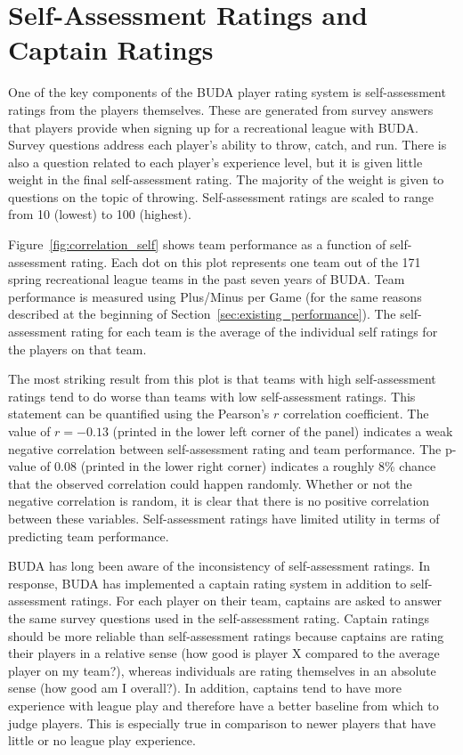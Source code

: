 \section{Self-Assessment Ratings and Captain Ratings}\label{sec:self_rating}

One of the key components of the BUDA player rating system is self-assessment ratings from the players themselves.  These are generated from survey answers that players provide when signing up for a recreational league with BUDA. Survey questions address each player's ability to throw, catch, and run.  There is also a question related to each player's experience level, but it is given little weight in the final self-assessment rating. The majority of the weight is given to questions on the topic of throwing. Self-assessment ratings are scaled to range from 10 (lowest) to 100 (highest).

Figure~\ref{fig:correlation_self} shows team performance as a function of self-assessment rating. Each dot on this plot represents one team out of the 171 spring recreational league teams in the past seven years of BUDA.  Team performance is measured using Plus/Minus per Game (for the same reasons described at the beginning of Section~\ref{sec:existing_performance}). The self-assessment rating for each team is the average of the individual self ratings for the players on that team.

The most striking result from this plot is that teams with high self-assessment ratings tend to do worse than teams with low self-assessment ratings. This statement can be quantified using the Pearson's $r$ correlation coefficient. The value of $r = -0.13$ (printed in the lower left corner of the panel) indicates a weak negative correlation between self-assessment rating and team performance.   The p-value of 0.08 (printed in the lower right corner) indicates a roughly 8\% chance that the observed correlation could happen randomly. Whether or not the negative correlation is random, it is clear that there is no positive correlation between these variables.  Self-assessment ratings have limited utility in terms of predicting team performance.

BUDA has long been aware of the inconsistency of self-assessment ratings.  In response, BUDA has implemented a captain rating system in addition to self-assessment ratings.  For each player on their team, captains are asked to answer the same survey questions used in the self-assessment rating.  Captain ratings should be more reliable than self-assessment ratings because captains are rating their players in a relative sense (how good is player X compared to the average player on my team?), whereas individuals are rating themselves in an absolute sense (how good am I overall?). In addition, captains tend to have more experience with league play and therefore have a better baseline from which to judge players. This is especially true in comparison to newer players that have little or no league play experience.

